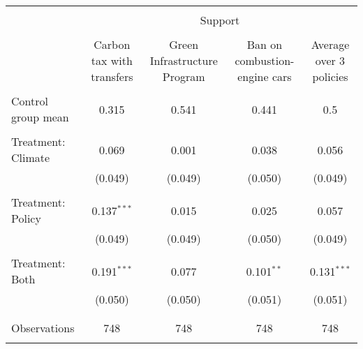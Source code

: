 
\begin{tabular}{@{\extracolsep{5pt}}lcccc} 
\\[-1.8ex]\hline 
\hline \\[-1.8ex] 
 & \multicolumn{4}{c}{Support} \\ 
\cline{2-5} 
\\[-1.8ex] & Carbon tax with transfers & Green Infrastructure Program & Ban on combustion-engine cars & Average over 3 policies \\ 
\hline \\[-1.8ex] 
 Control group mean & 0.315 & 0.541 & 0.441 & 0.5  \\ \hline \\[-1.8ex] Treatment: Climate & 0.069 & 0.001 & 0.038 & 0.056 \\ 
  & (0.049) & (0.049) & (0.050) & (0.049) \\ 
  & & & & \\ 
 Treatment: Policy & 0.137$^{***}$ & 0.015 & 0.025 & 0.057 \\ 
  & (0.049) & (0.049) & (0.050) & (0.049) \\ 
  & & & & \\ 
 Treatment: Both & 0.191$^{***}$ & 0.077 & 0.101$^{**}$ & 0.131$^{***}$ \\ 
  & (0.050) & (0.050) & (0.051) & (0.051) \\ 
  & & & & \\ 
\hline \\[-1.8ex] 

Observations & 748 & 748 & 748 & 748 \\ 
\hline 
\hline \\[-1.8ex] 
\end{tabular} 